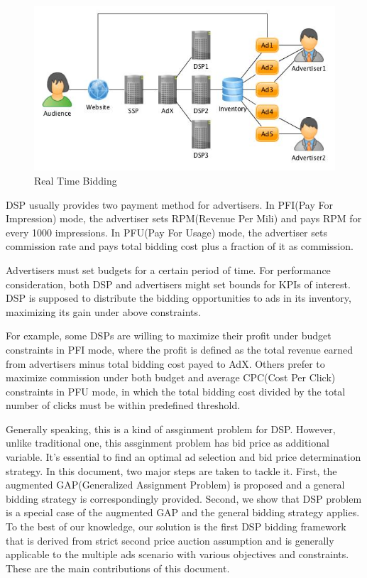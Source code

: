 \documentclass[sigconf]{acmart}
\begin{document}
\begin{figure}[!h]
\centering
\includegraphics[width=1.0\linewidth]{./DSP.jpg}
\caption{Real Time Bidding}
\end{figure}

DSP usually provides two payment method for advertisers.
In PFI(Pay For Impression) mode, the advertiser sets RPM(Revenue Per Mili) and pays RPM for every 1000 impressions.
In PFU(Pay For Usage) mode, the advertiser sets commission rate and pays total bidding cost plus a fraction of it as commission.

Advertisers must set budgets for a certain period of time.
For performance consideration, both DSP and advertisers might set bounds for KPIs of interest.
DSP is supposed to distribute the bidding opportunities to ads in its inventory, maximizing its gain under above constraints.

For example, some DSPs are willing to maximize their profit under budget constraints in PFI mode,
    where the profit is defined as the total revenue earned from advertisers minus total bidding cost payed to AdX.
Others prefer to maximize commission under both budget and average CPC(Cost Per Click) constraints in PFU mode,
    in which the total bidding cost divided by the total number of clicks must be within predefined threshold.

Generally speaking, this is a kind of assginment problem for DSP.
However, unlike traditional one, this assginment problem has bid price as additional variable.
It's essential to find an optimal ad selection and bid price determination strategy.
In this document, two major steps are taken to tackle it.
First, the augmented GAP(Generalized Assignment Problem) is proposed and a general bidding strategy is correspondingly provided.
Second, we show that DSP problem is a special case of the augmented GAP and the general bidding strategy applies.
To the best of our knowledge, our solution is the first DSP bidding framework
    that is derived from strict second price auction assumption and is generally applicable
    to the multiple ads scenario with various objectives and constraints.
These are the main contributions of this document.
\end{document}
